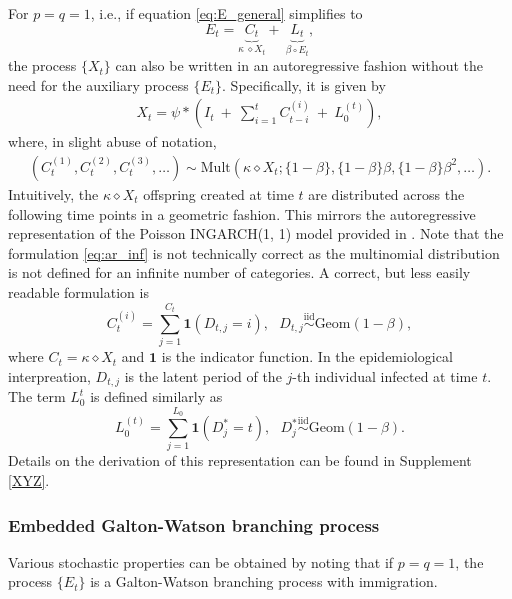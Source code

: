 \documentclass{article}
\begin{document}
For $p = q = 1$, i.e., if equation \eqref{eq:E_general}  simplifies to
$$
E_t = \underbrace{C_t}_{\kappa \ \diamond X_t} + \ \underbrace{L_t}_{\beta \circ E_t},
$$
the process $\{X_t\}$ can also be written in an autoregressive fashion without the need for the auxiliary process $\{E_t\}$. Specifically, it is given by
\begin{align*}
X_t = \psi * \left(I_t \ + \ \sum_{i = 1}^t C_{t - i}^{(i)}  \ + \ L_0^{(t)}\right),
\end{align*}
where, in slight abuse of notation,
\begin{align}
(C_t^{(1)}, C_t^{(2)}, C_t^{(3)}, \dots) \sim \text{Mult}(\kappa \diamond X_{t}; \{1- \beta\}, \{1 - \beta\}\beta, \{1 - \beta\}\beta^2, \dots).\label{eq:ar_inf}
\end{align}
Intuitively, the $\kappa \diamond X_t$ offspring created at time $t$ are distributed across the following time points in a geometric fashion. This mirrors the autoregressive representation of the Poisson INGARCH(1, 1) model provided in \cite{Fokianos2016}. Note that the formulation \eqref{eq:ar_inf} is not technically correct as the multinomial distribution is not defined for an infinite number of categories. A correct, but less easily readable formulation is
$$
C_t^{(i)} = \sum_{j = 1}^{C_t} \mathbf{1}(D_{t, j} = i), \ \ \ D_{t, j} \stackrel{\text{iid}}{\sim} \text{Geom}(1 - \beta),
$$
where $C_t  =\kappa \diamond X_t$ and $\mathbf{1}$ is the indicator function. In the epidemiological interpreation, $D_{t, j}$ is the latent period of the $j$-th individual infected at time $t$. The term $L_0^{t}$ is defined similarly as
$$
L_0^{(t)} = \sum_{j = 1}^{L_0} \mathbf{1}(D^*_j = t), \ \ \ D^*_{j} \stackrel{\text{iid}}{\sim} \text{Geom}(1 - \beta).
$$
Details on the derivation of this representation can be found in Supplement \ref{XYZ}.

\subsubsection{Embedded Galton-Watson branching process}
\label{subsec:embedded_galton_watson}

Various stochastic properties can be obtained by noting that if $p = q = 1$, the process $\{E_t\}$ is a Galton-Watson branching process with immigration. 
\end{document}
